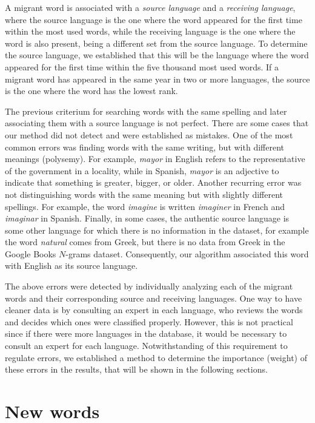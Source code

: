 \documentclass[10pt,letterpaper]{article} %
\begin{document}
A migrant word is associated with a \textit{source language} and a
\textit{receiving language}, where the source language is the one where the
word appeared for the first time within the most used words,
while the receiving language is the one where the word is also present, being a
different set from the source language. 
To determine the source language, we established that this will be the language
where the word appeared for the first time within the five thousand most used
words. If a migrant word has appeared in the same year in two or
more languages, the source is the one where the word has the lowest rank.


The previous criterium for searching words with the same spelling and later
associating them with a source language is not perfect. There are some cases
that our method did not detect and were established as mistakes. One of the
most common errors was finding words with the same writing, but with different
meanings (polysemy). For example,  \textit{mayor} in English refers to the representative
of the government in a locality, while in Spanish, \textit{mayor} is an
adjective to indicate that something is greater, bigger, or older.  Another recurring
error was not distinguishing words with the same meaning but with slightly different spellings. For example, the word \textit{imagine} is written \textit{imaginer} in
French and \textit{imaginar} in Spanish.  Finally, in some cases, the authentic
source language is some other language for which there is no information in the
dataset, for example the word \textit{natural} comes from Greek, but there is no data
from Greek in the Google Books $N$-grams dataset. Consequently, our algorithm associated this word with English as its source language.

The above errors were detected by individually analyzing each of the migrant
words and their corresponding source and receiving languages. One way to have
cleaner data is by consulting an expert in each language, who reviews the words
and decides which ones were classified properly. However, this is not practical
since if there were more languages in the database, it would be necessary to
consult an expert for each language. Notwithstanding of this requirement to
regulate errors, we established a method to determine the importance (weight)
of these errors in the results, that will be shown in the following sections. 
\section*{New words} %
 
\end{document}
